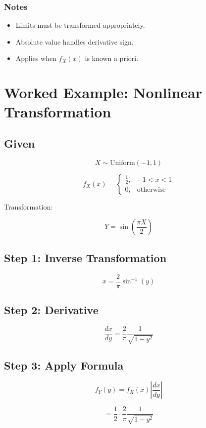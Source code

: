 \documentclass[12pt]{article}
\begin{document}
\subsubsection*{Notes}

\begin{itemize}
\item Limits must be transformed appropriately.
\item Absolute value handles derivative sign.
\item Applies when $f_X(x)$ is known a priori.
\end{itemize}

\section{Worked Example: Nonlinear Transformation}

\subsection*{Given}

\[
X \sim \text{Uniform}(-1,1)
\]

\[
f_X(x)=
\begin{cases}
\frac12, & -1<x<1 \\
0, & \text{otherwise}
\end{cases}
\]

Transformation:

\[
Y = \sin\left(\frac{\pi X}{2}\right)
\]

\subsection*{Step 1: Inverse Transformation}

\[
x = \frac{2}{\pi}\sin^{-1}(y)
\]

\subsection*{Step 2: Derivative}

\[
\frac{dx}{dy} = \frac{2}{\pi}\frac{1}{\sqrt{1-y^2}}
\]

\subsection*{Step 3: Apply Formula}

\[
f_Y(y) = f_X(x)\left|\frac{dx}{dy}\right|
\]

\[
= \frac12 \cdot \frac{2}{\pi}\frac{1}{\sqrt{1-y^2}}
\]
\end{document}
